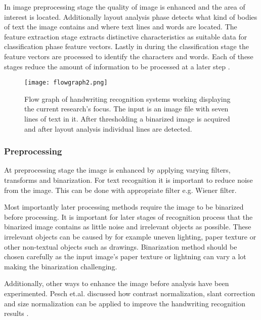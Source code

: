 \documentclass{article}
\begin{document}
    In image preprocessing stage the quality of image is enhanced and the area of interest is located. Additionally layout analysis phase detects what kind of bodies of text the image contains and where text lines and words are located. The feature extraction stage extracts distinctive characteristics as suitable data for classification phase feature vectors. Lastly in during the classification stage the feature vectors are processed to identify the characters and words. Each of these stages reduce the amount of information to be processed at a later step \cite{Cheriet2007}.

    \begin{figure}[!ht]
      \centering
      \texttt{[image: flowgraph2.png]}
      \caption{Flow graph of handwriting recognition systems working displaying the current research's focus. The input is an image file with seven lines of text in it. After thresholding a binarized image is acquired and after layout analysis individual lines are detected.  \label{fig:flow} }
    \end{figure}

      \subsubsection{Preprocessing}
        At preprocessing stage the image is enhanced by applying varying filters, transforms and binarization. For text recognition it is important to reduce noise from the image. This can be done with appropriate filter e.g. Wiener filter.

        Most  importantly later processing methods require the image to be binarized before processing. It is important for later stages of recognition process that the binarized image contains as little noise and irrelevant objects as possible.  These irrelevant objects can be caused by for example uneven lighting, paper texture or other non-textual objects such as drawings. Binarization method should be chosen carefully as the input image's paper texture or lightning can vary a lot making the binarization challenging.

        Additionally, other ways to enhance the image before analysis have been experimented. Pesch et.al. discussed how contrast normalization, slant correction and size normalization can be applied to improve the handwriting recognition results \cite{Pesch2012}.
\end{document}
